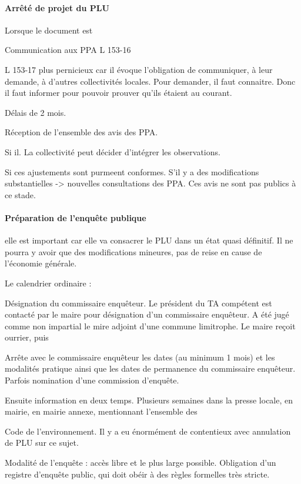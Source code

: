 		\paragraph{Arrêté de projet du PLU } Lorsque le document est

		Communication aux PPA L 153-16

		L 153-17 plus pernicieux car il évoque l'obligation de communiquer, à leur demande, à d'autres collectivités locales. Pour demander, il faut connaitre. Donc il faut informer pour pouvoir prouver qu'ils étaient au courant.

		Délais de 2 mois.

		Réception de l'ensemble des avis des PPA.

		Si il. La collectivité peut décider d'intégrer les observations.

		Si ces ajustements sont purmeent conformes. S'il y a des modifications substantielles -> nouvelles consultations des PPA. Ces avis ne sont pas publics à ce stade.

		\paragraph{Préparation de l'enquête publique}

		elle est important car elle va consacrer le PLU dans un état quasi définitif. Il ne pourra y avoir que des modifications mineures, pas de reise en cause de l'économie générale.

		Le calendrier ordinaire :

		Désignation du commissaire enquêteur. Le président du TA compétent est contacté par le maire pour désignation d'un commissaire enquêteur.
		A été jugé comme non impartial le mire adjoint d'une commune limitrophe.
		Le maire reçoit ourrier, puis

		Arrête avec le commissaire enquêteur les dates (au minimum 1 mois) et les modalités pratique ainsi que les dates de permanence du commissaire enquêteur. Parfois nomination d'une commission d'enquête.

		Ensuite information en deux temps. Plusieurs semaines dans la presse locale, en mairie, en mairie annexe, mentionnant l'ensemble des

		Code de l'environnement. Il y a eu énormément de contentieux avec annulation de PLU sur ce sujet.

		Modalité de l'enquête : accès libre et le plus large possible.
		Obligation d'un registre d'enquête public, qui doit obéir à des règles formelles très stricte.

